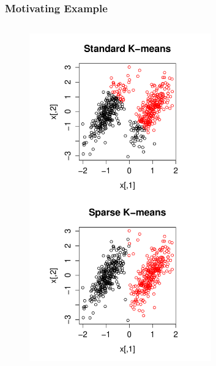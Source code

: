 \documentclass{beamer}
\begin{document}

\begin{frame}[fragile]
\frametitle{Motivating Example}
\begin{columns}[c] %

\begin{figure}[h!]
  \centering
    \includegraphics[width=0.7\textwidth]{example.pdf}
\end{figure}




\end{columns}
\end{frame}
\end{document}
